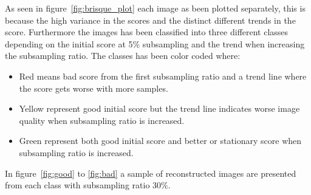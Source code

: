 As seen in figure~\ref{fig:brisque_plot} each image as been plotted separately, this is because the high variance in the scores and the distinct different trends in the score. Furthermore the images has been classified into three different classes depending on the initial score at 5\% subsampling and the trend when increasing the subsampling ratio. The classes has been color coded where:

\begin{itemize}
\item Red means bad score from the first subsampling ratio and a trend line where the score gets worse with more samples.
\item Yellow represent good initial score but the trend line indicates worse image quality when subsampling ratio is increased.
\item Green represent both good initial score and better or stationary score when subsampling ratio is increased. 
\end{itemize}

In figure~\ref{fig:good} to \ref{fig:bad} a sample of reconstructed  images are presented from each class with subsampling ratio 30\%. 




